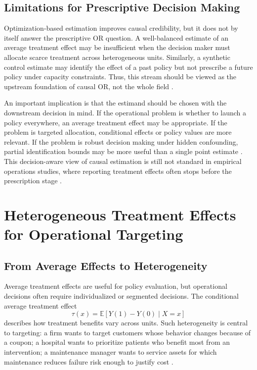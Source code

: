 \documentclass[11pt]{article}
\begin{document}
\subsection{Limitations for Prescriptive Decision Making}

Optimization-based estimation improves causal credibility, but it does not by itself answer the prescriptive OR question. A well-balanced estimate of an average treatment effect may be insufficient when the decision maker must allocate scarce treatment across heterogeneous units. Similarly, a synthetic control estimate may identify the effect of a past policy but not prescribe a future policy under capacity constraints. Thus, this stream should be viewed as the upstream foundation of causal OR, not the whole field \citep{cousineau2023optimization,fernandez2022causal}.

An important implication is that the estimand should be chosen with the downstream decision in mind. If the operational problem is whether to launch a policy everywhere, an average treatment effect may be appropriate. If the problem is targeted allocation, conditional effects or policy values are more relevant. If the problem is robust decision making under hidden confounding, partial identification bounds may be more useful than a single point estimate \citep{rosenbaum2002observational,kallus2018confounding}. This decision-aware view of causal estimation is still not standard in empirical operations studies, where reporting treatment effects often stops before the prescription stage \citep{ho2017causal}.

\section{Heterogeneous Treatment Effects for Operational Targeting}
\label{sec:hte}

\subsection{From Average Effects to Heterogeneity}

Average treatment effects are useful for policy evaluation, but operational decisions often require individualized or segmented decisions. The conditional average treatment effect
\[
    \tau(x)=\mathbb{E}[Y(1)-Y(0)\mid X=x]
\]
describes how treatment benefits vary across units. Such heterogeneity is central to targeting: a firm wants to target customers whose behavior changes because of a coupon; a hospital wants to prioritize patients who benefit most from an intervention; a maintenance manager wants to service assets for which maintenance reduces failure risk enough to justify cost \citep{fernandez2022causal,leporeni2023causally}.
\end{document}
